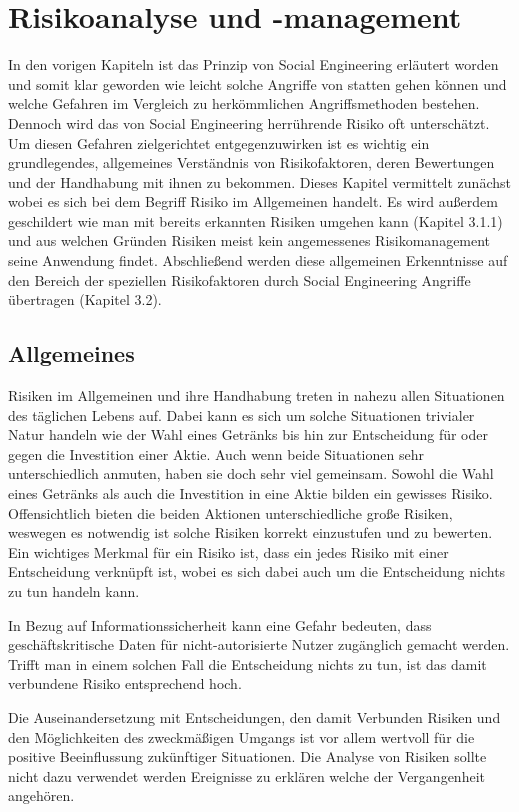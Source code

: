 \section{Risikoanalyse und -management}\label{sec:risikoanalyse}
In den vorigen Kapiteln ist das Prinzip von Social Engineering erläutert worden und somit klar
geworden wie leicht solche Angriffe von statten gehen können und welche Gefahren im Vergleich zu
herkömmlichen Angriffsmethoden bestehen.
Dennoch wird das von Social Engineering herrührende Risiko oft unterschätzt.
Um diesen Gefahren zielgerichtet entgegenzuwirken ist es wichtig ein grundlegendes, allgemeines
Verständnis von Risikofaktoren, deren Bewertungen und der Handhabung mit ihnen zu bekommen.
Dieses Kapitel vermittelt zunächst wobei es sich bei dem Begriff Risiko im Allgemeinen handelt.
Es wird außerdem geschildert wie man mit bereits erkannten Risiken umgehen kann (Kapitel 3.1.1) und
aus welchen Gründen Risiken meist kein angemessenes Risikomanagement seine Anwendung findet.
Abschließend werden diese allgemeinen Erkenntnisse auf den Bereich der speziellen Risikofaktoren durch
Social Engineering Angriffe übertragen (Kapitel 3.2).

\subsection{Allgemeines}\label{sec:allgemeines}
Risiken im Allgemeinen und ihre Handhabung treten in nahezu allen Situationen des täglichen Lebens
auf.
Dabei kann es sich um solche Situationen trivialer Natur handeln wie der Wahl eines Getränks bis hin
zur Entscheidung für oder gegen die Investition einer Aktie.
Auch wenn beide Situationen sehr unterschiedlich anmuten, haben sie doch sehr viel gemeinsam.
Sowohl die Wahl eines Getränks als auch die Investition in eine Aktie bilden ein gewisses Risiko.
Offensichtlich bieten die beiden Aktionen unterschiedliche große Risiken, weswegen es notwendig ist
solche Risiken korrekt einzustufen und zu bewerten.
Ein wichtiges Merkmal für ein Risiko ist, dass ein jedes Risiko mit einer Entscheidung verknüpft ist,
wobei es sich dabei auch um die Entscheidung nichts zu tun handeln kann.

In Bezug auf Informationssicherheit kann eine Gefahr bedeuten, dass geschäftskritische Daten für
nicht-autorisierte Nutzer zugänglich gemacht werden.
Trifft man in einem solchen Fall die Entscheidung nichts zu tun, ist das damit verbundene Risiko
entsprechend hoch.

Die Auseinandersetzung mit Entscheidungen, den damit Verbunden Risiken und den Möglichkeiten des
zweckmäßigen Umgangs ist vor allem wertvoll für die positive Beeinflussung zukünftiger Situationen.
Die Analyse von Risiken sollte nicht dazu verwendet werden Ereignisse zu erklären welche der
Vergangenheit angehören.

